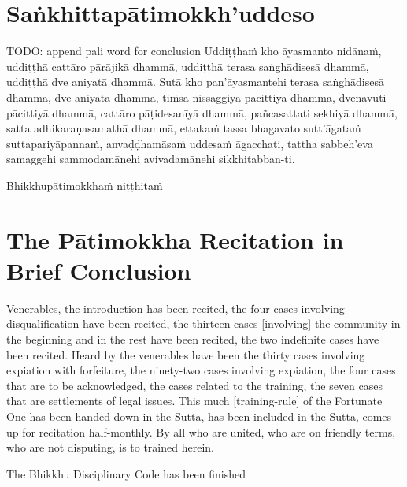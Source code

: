 \section{Saṅkhittapātimokkh'uddeso}
\label{sankhittapatimokkh'uddeso}
TODO: append pali word for conclusion
Uddiṭṭhaṁ kho āyasmanto nidānaṁ, uddiṭṭhā cattāro pārājikā dhammā, uddiṭṭhā terasa saṅghādisesā dhammā, uddiṭṭhā dve aniyatā dhammā. Sutā kho pan'āyasmantehi terasa saṅghādisesā dhammā, dve aniyatā dhammā, tiṁsa nissaggiyā pācittiyā dhammā, dvenavuti pācittiyā dhammā, cattāro pāṭidesanīyā dhammā, pañcasattati sekhiyā dhammā, satta adhikaraṇasamathā dhammā, ettakaṁ tassa bhagavato sutt'āgataṁ suttapariyāpannaṁ, anvaḍḍhamāsaṁ uddesaṁ āgacchati, tattha sabbeh'eva samaggehi sammodamānehi avivadamānehi sikkhitabban-ti.

\begin{outro}
Bhikkhupātimokkhaṁ niṭṭhitaṁ
\end{outro}

\clearpage

\section{The Pātimokkha Recitation in Brief Conclusion}
\label{patimokkha-in-brief-conclusion}

Venerables, the introduction has been recited, the four cases involving disqualification have been recited, the thirteen cases [involving] the community in the beginning and in the rest have been recited, the two indefinite cases have been recited. Heard by the venerables have been the thirty cases involving expiation with forfeiture, the ninety-two cases involving expiation, the four cases that are to be acknowledged, the cases related to the training, the seven cases that are settlements of legal issues. This much [training-rule] of the Fortunate One has been handed down in the Sutta, has been included in the Sutta, comes up for recitation half-monthly. By all who are united, who are on friendly terms, who are not disputing, is to trained herein.

\begin{outro}
  The Bhikkhu Disciplinary Code has been finished
\end{outro}

\clearpage
